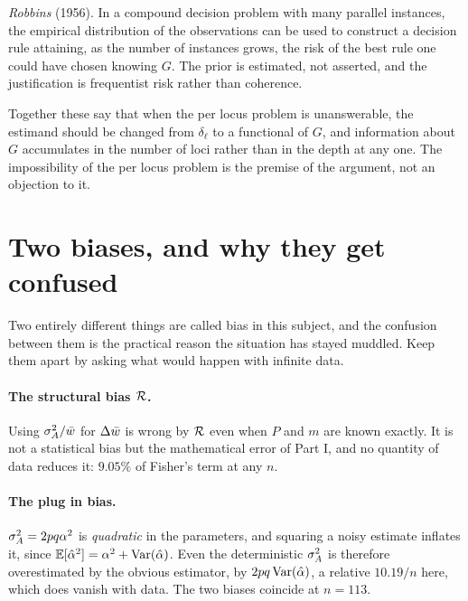 \emph{Robbins} (1956). In a compound decision problem with many parallel instances, the empirical
distribution of the observations can be used to construct a decision rule attaining, as the number of instances grows, the risk of the
best rule one could have chosen knowing $G$. The prior is estimated, not asserted, and the
justification is frequentist risk rather than coherence.

Together these say that when the per locus problem is unanswerable, the estimand should be changed
from $\delta_\ell$ to a functional of $G$, and information about $G$ accumulates in the number of
loci rather than in the depth at any one. The impossibility of the per locus problem is the premise
of the argument, not an objection to it.


\section{Two biases, and why they get confused}
\label{ftns:sec:bias}

Two entirely different things are called bias in this subject, and the confusion between them is
the practical reason the situation has stayed muddled. Keep them apart by asking what would happen
with infinite data.

\paragraph{The structural bias $\mathcal{R}$.} Using $\sigma^{2}_{A}/\bar{w}$ for $\Delta\bar{w}$ is wrong by $\mathcal{R}$ even
when $P$ and $m$ are known exactly. It is not a statistical bias but the mathematical error of
Part I, and no quantity of data reduces it: $9.05\%$ of Fisher's term at any $n$.

\paragraph{The plug in bias.} $\sigma^{2}_{A}=2pq\alpha^2$ is \emph{quadratic} in the parameters, and squaring
a noisy estimate inflates it, since $\mathbb{E}[\hat\alpha^2]=\alpha^2+\operatorname{Var}(\hat\alpha)$. Even the
deterministic $\sigma^{2}_{A}$ is therefore overestimated by the obvious estimator, by $2pq\operatorname{Var}(\hat\alpha)$,
a relative $10.19/n$ here, which does vanish with data. The two biases coincide at $n=113$.

